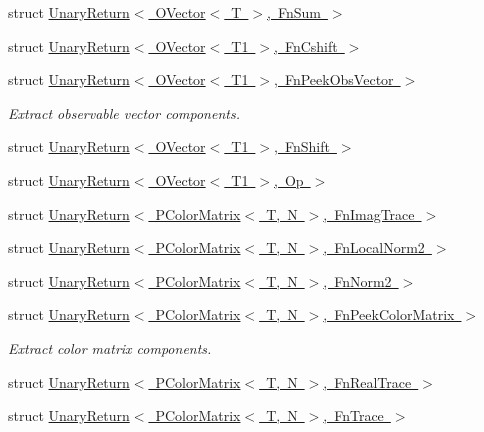 \begin{DoxyCompactItemize}
\item 
struct \mbox{\hyperlink{structENSEM_1_1UnaryReturn_3_01OVector_3_01T_01_4_00_01FnSum_01_4}{Unary\+Return$<$ O\+Vector$<$ T $>$, Fn\+Sum $>$}}
\item 
struct \mbox{\hyperlink{structENSEM_1_1UnaryReturn_3_01OVector_3_01T1_01_4_00_01FnCshift_01_4}{Unary\+Return$<$ O\+Vector$<$ T1 $>$, Fn\+Cshift $>$}}
\item 
struct \mbox{\hyperlink{structENSEM_1_1UnaryReturn_3_01OVector_3_01T1_01_4_00_01FnPeekObsVector_01_4}{Unary\+Return$<$ O\+Vector$<$ T1 $>$, Fn\+Peek\+Obs\+Vector $>$}}
\begin{DoxyCompactList}\small\item\em Extract observable vector components. \end{DoxyCompactList}\item 
struct \mbox{\hyperlink{structENSEM_1_1UnaryReturn_3_01OVector_3_01T1_01_4_00_01FnShift_01_4}{Unary\+Return$<$ O\+Vector$<$ T1 $>$, Fn\+Shift $>$}}
\item 
struct \mbox{\hyperlink{structENSEM_1_1UnaryReturn_3_01OVector_3_01T1_01_4_00_01Op_01_4}{Unary\+Return$<$ O\+Vector$<$ T1 $>$, Op $>$}}
\item 
struct \mbox{\hyperlink{structENSEM_1_1UnaryReturn_3_01PColorMatrix_3_01T_00_01N_01_4_00_01FnImagTrace_01_4}{Unary\+Return$<$ P\+Color\+Matrix$<$ T, N $>$, Fn\+Imag\+Trace $>$}}
\item 
struct \mbox{\hyperlink{structENSEM_1_1UnaryReturn_3_01PColorMatrix_3_01T_00_01N_01_4_00_01FnLocalNorm2_01_4}{Unary\+Return$<$ P\+Color\+Matrix$<$ T, N $>$, Fn\+Local\+Norm2 $>$}}
\item 
struct \mbox{\hyperlink{structENSEM_1_1UnaryReturn_3_01PColorMatrix_3_01T_00_01N_01_4_00_01FnNorm2_01_4}{Unary\+Return$<$ P\+Color\+Matrix$<$ T, N $>$, Fn\+Norm2 $>$}}
\item 
struct \mbox{\hyperlink{structENSEM_1_1UnaryReturn_3_01PColorMatrix_3_01T_00_01N_01_4_00_01FnPeekColorMatrix_01_4}{Unary\+Return$<$ P\+Color\+Matrix$<$ T, N $>$, Fn\+Peek\+Color\+Matrix $>$}}
\begin{DoxyCompactList}\small\item\em Extract color matrix components. \end{DoxyCompactList}\item 
struct \mbox{\hyperlink{structENSEM_1_1UnaryReturn_3_01PColorMatrix_3_01T_00_01N_01_4_00_01FnRealTrace_01_4}{Unary\+Return$<$ P\+Color\+Matrix$<$ T, N $>$, Fn\+Real\+Trace $>$}}
\item 
struct \mbox{\hyperlink{structENSEM_1_1UnaryReturn_3_01PColorMatrix_3_01T_00_01N_01_4_00_01FnTrace_01_4}{Unary\+Return$<$ P\+Color\+Matrix$<$ T, N $>$, Fn\+Trace $>$}}

\end{DoxyCompactItemize}
